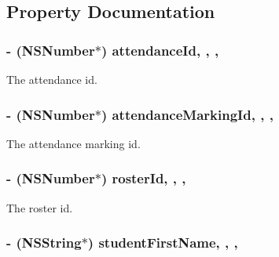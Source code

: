 \subsection{Property Documentation}
\hypertarget{interface_attendance_a47331d4a3bf6a66898af099cf7e8ceb3}{
\subsubsection[{attendance\+Id}]{\setlength{\rightskip}{0pt plus 5cm}-\/ (N\+S\+Number$\ast$) attendance\+Id\hspace{0.3cm}{\ttfamily [read]}, {\ttfamily [write]}, {\ttfamily [nonatomic]}, {\ttfamily [assign]}}}\label{interface_attendance_a47331d4a3bf6a66898af099cf7e8ceb3}
The attendance id. \hypertarget{interface_attendance_a2a250e9bc55299c5f2c4936f1346a396}{
\subsubsection[{attendance\+Marking\+Id}]{\setlength{\rightskip}{0pt plus 5cm}-\/ (N\+S\+Number$\ast$) attendance\+Marking\+Id\hspace{0.3cm}{\ttfamily [read]}, {\ttfamily [write]}, {\ttfamily [nonatomic]}, {\ttfamily [assign]}}}\label{interface_attendance_a2a250e9bc55299c5f2c4936f1346a396}
The attendance marking id. \hypertarget{interface_attendance_abd800fad3cefbc7a28865fdbf9841ce5}{
\subsubsection[{roster\+Id}]{\setlength{\rightskip}{0pt plus 5cm}-\/ (N\+S\+Number$\ast$) roster\+Id\hspace{0.3cm}{\ttfamily [read]}, {\ttfamily [write]}, {\ttfamily [nonatomic]}, {\ttfamily [assign]}}}\label{interface_attendance_abd800fad3cefbc7a28865fdbf9841ce5}
The roster id. \hypertarget{interface_attendance_ac19139347042d483a23013202a923ff8}{
\subsubsection[{student\+First\+Name}]{\setlength{\rightskip}{0pt plus 5cm}-\/ (N\+S\+String$\ast$) student\+First\+Name\hspace{0.3cm}{\ttfamily [read]}, {\ttfamily [write]}, {\ttfamily [nonatomic]}, {\ttfamily [assign]}}}\label{interface_attendance_ac19139347042d483a23013202a923ff8}
